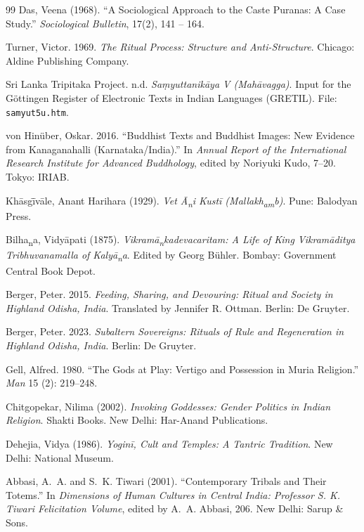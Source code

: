 \documentclass[11pt,twoside,letterpaper]{article}
\begin{document}
\begin{thebibliography}{99}
Das, Veena (1968). ``A Sociological Approach to the Caste Puranas: A Case Study.'' \textit{Sociological Bulletin}, 17(2), 141 -- 164.

Turner, Victor. 1969. \textit{The Ritual Process: Structure and Anti-Structure}.
Chicago: Aldine Publishing Company.

{Sri Lanka Tripitaka Project}. n.d. \textit{Saṃyuttanikāya V (Mahāvagga)}.
Input for the Göttingen Register of Electronic Texts in Indian Languages (GRETIL).
File: \texttt{samyut5u.htm}.

von Hinüber, Oskar. 2016. ``Buddhist Texts and Buddhist Images: New Evidence
from Kanaganahalli (Karnataka/India).'' In \textit{Annual Report of the
International Research Institute for Advanced Buddhology}, edited by Noriyuki Kudo,
7–20. Tokyo: IRIAB.

Khāsg\={ī}vāle, Anant Harihara (1929). \textit{Vet Ā\textsubscript{n}i Kustī (Mallakh\textsubscript{a}\textsubscript{m}b)}. Pune: Balodyan Press.

Bilha\textsubscript{n}a, Vidyāpati (1875). \textit{Vikramā\textsubscript{n}kadevacaritam: A Life of King Vikramāditya Tribhuvanamalla of Kalyā\textsubscript{n}a}. Edited by Georg B\"{u}hler. Bombay: Government Central Book Depot.

Berger, Peter. 2015. \textit{Feeding, Sharing, and Devouring: Ritual and Society in Highland Odisha, India}. Translated by Jennifer R. Ottman. Berlin: De Gruyter.

Berger, Peter. 2023. \textit{Subaltern Sovereigns: Rituals of Rule and Regeneration in Highland Odisha, India}. Berlin: De Gruyter.

Gell, Alfred. 1980. ``The Gods at Play: Vertigo and Possession in Muria Religion.'' 
\textit{Man} 15 (2): 219–248.

Chitgopekar, Nilima (2002). \textit{Invoking Goddesses: Gender Politics in Indian Religion}. Shakti Books. New Delhi: Har-Anand Publications.

Dehejia, Vidya (1986). \textit{Yoginī, Cult and Temples: A Tantric Tradition}. New Delhi: National Museum.

Abbasi, A.~A. and S.~K. Tiwari (2001). ``Contemporary Tribals and Their Totems.'' In \textit{Dimensions of Human Cultures in Central India: Professor S. K. Tiwari Felicitation Volume}, edited by A.~A. Abbasi, 206. New Delhi: Sarup \& Sons.


\end{thebibliography}
\end{document}

